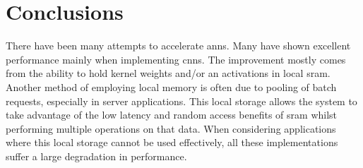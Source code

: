 \documentclass[journal]{IEEEtran}
\begin{document}


\section{Conclusions}
\label{sec:Conclusions}
There have been many attempts to accelerate \acp{ann}. Many have shown excellent performance mainly when implementing \acp{cnn}. The improvement mostly comes from the ability to 
hold kernel weights and/or \ac{an} activations in local \ac{sram}. Another method of employing local memory is often due to pooling of batch requests, especially in server applications.
This local storage allows the system to take advantage of the low latency and random access benefits of \ac{sram} whilst performing multiple operations on that data.
When considering applications where this local storage cannot be used effectively, all these implementations suffer a large degradation in performance.
\end{document}
